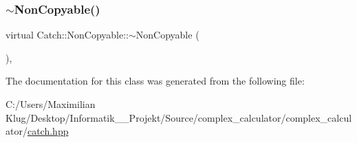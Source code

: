 \mbox{\label{class_catch_1_1_non_copyable_a81254677280fef337eb4a676e91e3293}} 
\subsubsection{\texorpdfstring{$\sim$\+Non\+Copyable()}{~NonCopyable()}}
{\footnotesize\ttfamily virtual Catch\+::\+Non\+Copyable\+::$\sim$\+Non\+Copyable (\begin{DoxyParamCaption}{ }\end{DoxyParamCaption})\hspace{0.3cm}{\ttfamily [protected]}, {\ttfamily [virtual]}}



The documentation for this class was generated from the following file\+:\begin{DoxyCompactItemize}
\item 
C\+:/\+Users/\+Maximilian Klug/\+Desktop/\+Informatik\+\_\+\_\+\+Projekt/\+Source/complex\+\_\+calculator/complex\+\_\+calculator/\mbox{\hyperlink{catch_8hpp}{catch.\+hpp}}\end{DoxyCompactItemize}
